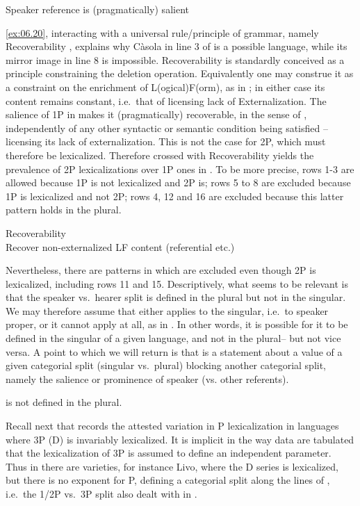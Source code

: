 \documentclass[output=paper]{langsci/langscibook}
\begin{document}
\ea%
    \label{ex:06.20}
    Speaker reference is (pragmatically) salient
\z

\eqref{ex:06.20}, interacting with a universal rule/principle of grammar,
namely Recoverability , explains why Càsola in line 3 of
 is a possible language, while its mirror image in line 8 is
impossible. Recoverability is standardly conceived as a principle constraining
the deletion operation. Equivalently one may construe it as a constraint on the
enrichment of L(ogical)F(orm), as in ; in either case its
content remains constant, i.e.\ that of licensing lack of Externalization. The
salience of 1P in  makes it (pragmatically) recoverable, in the
sense of , independently of any other syntactic or semantic
condition being satisfied – licensing its lack of externalization. This is not
the case for 2P, which must therefore be lexicalized. Therefore 
crossed with Recoverability yields the prevalence of 2P lexicalizations over 1P
ones in . To be more precise, rows 1-3 are allowed because
1P is not lexicalized and 2P is; rows 5 to 8 are excluded because 1P is
lexicalized and not 2P; rows 4, 12 and 16 are excluded because this latter
pattern holds in the plural.

\ea%
    \label{ex:06.21} Recoverability\\
    Recover non-externalized LF content (referential etc.)
\z

Nevertheless, there are patterns in  which are excluded
even though 2P is lexicalized, including rows 11 and 15. Descriptively, what
seems to be relevant is that the speaker vs.\ hearer split is defined in the
plural but not in the singular. We may therefore assume that 
either applies to the singular, i.e.\ to speaker proper, or it cannot apply at
all, as in . In other words, it is possible for it to be defined
in the singular of a given language, and not in the plural– but not vice versa.
A point to which we will return is that  is a statement about a
value of a given categorial split (singular vs.\ plural) blocking another
categorial split, namely the salience or prominence of speaker (vs. other
referents).

\ea%
    \label{ex:06.22}
     is not defined in the plural.
\z

Recall next that  records the attested variation in P
lexicalization in languages where 3P (D) is invariably lexicalized. It is
implicit in the way data are tabulated that the lexicalization of 3P is assumed
to define an independent parameter. Thus in  there are
varieties, for instance Livo, where the D series is lexicalized, but there is
no exponent for P, defining a categorial split along the lines of
, i.e.\ the 1/2P vs.\ 3P split also dealt with in
.
\end{document}
